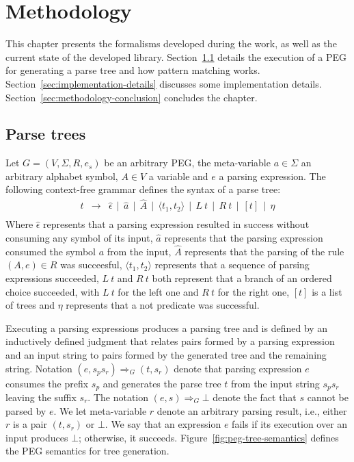 \chapter{Methodology}\label{chap:methodology}

This chapter presents the formalisms developed during the work, as well as the 
current state of the developed library. Section~\ref{sec:parse-tress} details
the execution of a PEG for generating a parse tree and how pattern matching works.
Section~\ref{sec:implementation-details} discusses some implementation details.
Section~\ref{sec:methodology-conclusion} concludes the chapter.

\section{Parse trees}\label{sec:parse-tress}

Let \(G = (V, \Sigma, R, e_s)\) be an arbitrary PEG, the meta-variable \(a \in \Sigma\) an
arbitrary alphabet symbol, \(A \in V\) a variable and \(e\) a parsing expression.
The following context-free grammar defines the syntax of a parse tree:
\[
   \begin{array}{lcl}
      t & \to & \hat{\epsilon} \, \mid \, \hat{a} \, \mid \, \hat{A} \, 
                    \mid \, \langle t_1, t_2 \rangle\,
                    \mid \, L \: t \, \mid \, R \: t \, \mid \, [t] \, 
                    \mid \, \eta \\
   \end{array}
\]
Where \(\hat{\epsilon}\) represents that a parsing expression resulted in 
success without consuming any symbol of its input, \(\hat{a}\) represents that
the parsing expression consumed the symbol \(a\) from the input, \(\hat{A}\)
represents that the parsing of the rule \((A, e) \in R\) was succeesful, 
\(\langle t_1, t_2 \rangle\) represents that a sequence of parsing expressions 
succeeded, 
\(L \: t\) and \(R \: t\) both represent that a branch of an ordered choice succeeded, 
with \(L \: t\) for the left one and \(R \: t\) for the right one,
\([t]\) is a list of trees and \(\eta\) represents that a not 
predicate was successful.

Executing a parsing expressions produces a parsing tree and is defined by an 
inductively defined judgment that relates pairs formed by a parsing expression 
and an input string to pairs formed by the generated tree and the remaining string.
Notation \((e,s_ps_r) \Rightarrow_G (t,s_r)\) denote that parsing expression \(e\)
consumes the prefix \(s_p\) and generates the parse tree \(t\) from the input string
\(s_ps_r\) leaving the suffix \(s_r\). The notation \((e,s) \Rightarrow_G \bot\) 
denote the fact that \(s\) cannot be parsed by \(e\). We let meta-variable \(r\) 
denote an arbitrary parsing result, i.e., either \(r\) is a pair \((t,s_r)\) or 
\(\bot\). We say that an expression \(e\) fails if its execution over an input 
produces \(\bot\); otherwise, it succeeds. Figure~\ref{fig:peg-tree-semantics} 
defines the PEG semantics for tree generation.

